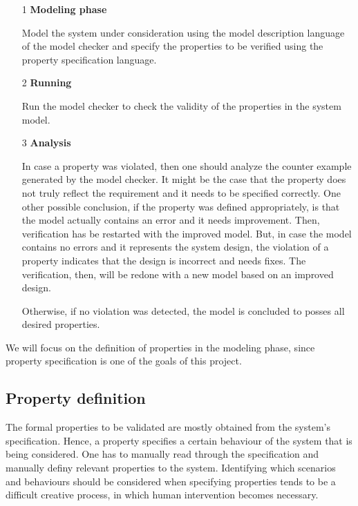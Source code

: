 \begin{itemize}

\item[1] \textbf{Modeling phase}

	Model the system under consideration using the model description language of the model checker and specify the properties to be verified using the property specification language.

\item[2] \textbf{Running}

	Run the model checker to check the validity of the properties in the system model.

\item[3] \textbf{Analysis}

In case a property was violated, then one should analyze the counter example generated by the model checker. It might be the case that the property does not truly reflect the requirement and it needs to be specified correctly. One other possible conclusion, if the property was defined appropriately, is that the model actually contains an  error and it needs improvement. Then, verification has be restarted with the improved model. But, in case the model contains no errors and it represents the system design, the violation of a property indicates that the design is incorrect and needs fixes. The verification, then, will be redone with a new model based on an improved design.
	
Otherwise, if no violation was detected, the model is concluded to posses all desired properties.

\end{itemize}

We will focus on the definition of properties in the modeling phase, since property specification is one of the goals of this project.

\subsection{Property definition}

The formal properties to be validated are mostly obtained from the system's specification\cite{Baier}. Hence, a property specifies a certain behaviour of the system that is being considered. One has to manually read through the specification and manually definy relevant properties to the system. Identifying which scenarios and behaviours should be considered when specifying properties tends to be a difficult creative process, in which human intervention becomes necessary. 

